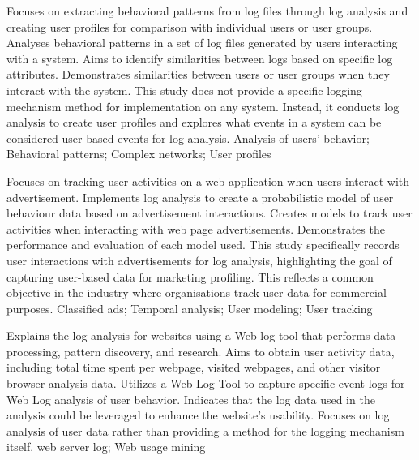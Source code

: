 {
    Focuses on extracting behavioral patterns from log files through log analysis and creating user profiles for comparison with individual users or user groups.
}
{
    Analyses behavioral patterns in a set of log files generated by users interacting with a system. Aims to identify similarities between logs based on specific log attributes.
}
{
    Demonstrates similarities between users or user groups when they interact with the system.
}
{
    This study does not provide a specific logging mechanism method for implementation on any system. Instead, it conducts log analysis to create user profiles and explores what events in a system can be considered user-based events for log analysis.
}
{
    Analysis of users' behavior; Behavioral patterns; Complex networks; User profiles
}

{
    Focuses on tracking user activities on a web application when users interact with advertisement. Implements log analysis to create a probabilistic model of user behaviour data based on advertisement interactions.
}
{
    Creates models to track user activities when interacting with web page advertisements.
}
{
    Demonstrates the performance and evaluation of each model used.
}
{
    This study specifically records user interactions with advertisements for log analysis, highlighting the goal of capturing user-based data for marketing profiling. This reflects a common objective in the industry where organisations track user data for commercial purposes.
}
{
    Classified ads; Temporal analysis; User modeling; User tracking
}

{
    Explains the log analysis for websites using a Web log tool that performs data processing, pattern discovery, and research. Aims to obtain user activity data, including total time spent per webpage, visited webpages, and other visitor browser analysis data.
}
{
    Utilizes a Web Log Tool to capture specific event logs for Web Log analysis of user behavior.
}
{
    Indicates that the log data used in the analysis could be leveraged to enhance the website's usability.
}
{
    Focuses on log analysis of user data rather than providing a method for the logging mechanism itself.
}
{
    web server log; Web usage mining
}